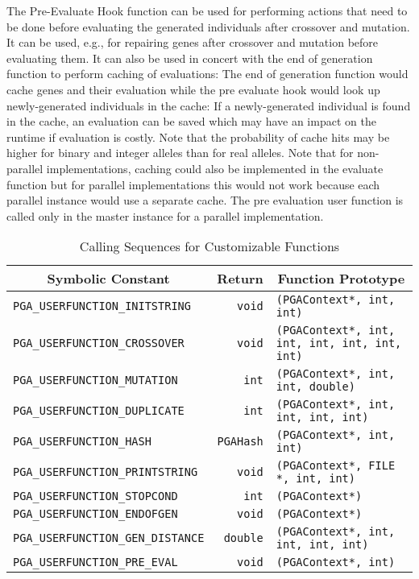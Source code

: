 \documentclass{report}
\begin{document}
The Pre-Evaluate Hook function can be used for performing actions that
need to be done before evaluating the generated individuals after
crossover and mutation. It can be used, e.g., for repairing genes after
crossover and mutation before evaluating them.
It can also be used in concert with the end of generation function to
perform caching of evaluations: The end of generation function would
cache genes and their evaluation while the pre evaluate hook would look
up newly-generated individuals in the cache: If a newly-generated
individual is found in the cache, an evaluation can be saved which may
have an impact on the runtime if evaluation is costly. Note that the
probability of cache hits may be higher for binary and integer alleles than
for real alleles. Note that for non-parallel implementations, caching
could also be implemented in the evaluate function but for parallel
implementations this would not work because each parallel instance would
use a separate cache.
The pre evaluation user function is called only in the master instance
for a parallel implementation.


\begin{table}
\centering
\caption
{
Calling Sequences for Customizable Functions\label{tab:custom-functions}
}
\begin{tabular}{|l|r|l|} \hline\hline
\multicolumn{1}{|c|}{Symbolic Constant} &
\multicolumn{1}{|c|}{Return} &
\multicolumn{1}{c|}{Function Prototype} \\ \hline
\verb+PGA_USERFUNCTION_INITSTRING+     &\verb+void+   &
    \verb+(PGAContext*, int, int)+ \\
\verb+PGA_USERFUNCTION_CROSSOVER+      &\verb+void+   &
    \verb+(PGAContext*, int, int, int, int, int, int)+ \\
\verb+PGA_USERFUNCTION_MUTATION+       &\verb+int+    &
    \verb+(PGAContext*, int, int, double)+ \\
\verb+PGA_USERFUNCTION_DUPLICATE+      &\verb+int+    &
    \verb+(PGAContext*, int, int, int, int)+ \\
\verb+PGA_USERFUNCTION_HASH+      &\verb+PGAHash+    &
    \verb+(PGAContext*, int, int)+ \\
\verb+PGA_USERFUNCTION_PRINTSTRING+    &\verb+void+   &
    \verb+(PGAContext*, FILE *, int, int)+ \\
\verb+PGA_USERFUNCTION_STOPCOND+       &\verb+int+    &
    \verb+(PGAContext*)+ \\
\verb+PGA_USERFUNCTION_ENDOFGEN+       &\verb+void+   &
    \verb+(PGAContext*)+ \\
\verb+PGA_USERFUNCTION_GEN_DISTANCE+   &\verb+double+ &
    \verb+(PGAContext*, int, int, int, int)+ \\
\verb+PGA_USERFUNCTION_PRE_EVAL+       &\verb+void+ &
    \verb+(PGAContext*, int)+ \\
\hline
\end{tabular}
\end{table}
\end{document}
